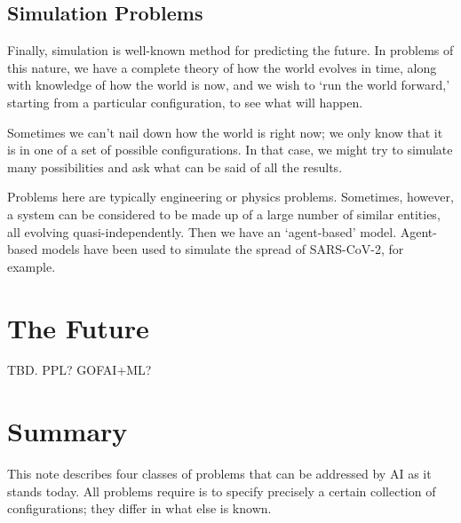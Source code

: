 \documentclass[10pt, a4paper, twocolumn]{article}
\begin{document}
\subsection{Simulation Problems}

Finally, simulation is well-known method for predicting the future. In problems
of this nature, we have a complete theory of how the world evolves in time,
along with knowledge of how the world is now, and we wish to `run the world
forward,' starting from a particular configuration, to see what will happen.

Sometimes we can't nail down how the world is right now; we only know that it is
in one of a set of possible configurations. In that case, we might try to
simulate many possibilities and ask what can be said of all the results.

Problems here are typically engineering or physics problems. Sometimes, however,
a system can be considered to be made up of a large number of similar entities,
all evolving quasi-independently. Then we have an `agent-based'
model. Agent-based models have been used to simulate the spread of SARS-CoV-2,
for example.

\section{The Future}

TBD. PPL? GOFAI+ML? 

\section{Summary}

This note describes four classes of problems that can be addressed by AI as it
stands today. All problems require is to specify precisely a certain collection
of configurations; they differ in what else is known.
\end{document}
